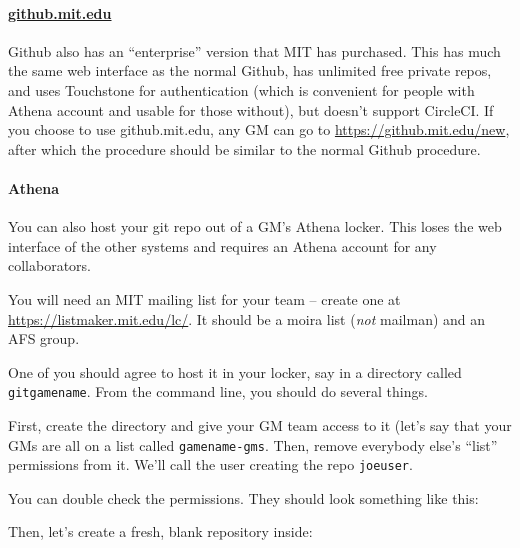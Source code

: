 \documentclass[green]{testgame}
\begin{document}
\paragraph*{\href{https://github.mit.edu}{github.mit.edu}} Github also has an ``enterprise'' version that MIT has purchased. This has much the same web interface as the normal Github, has unlimited free private repos, and uses Touchstone for authentication (which is convenient for people with Athena account and usable for those without), but doesn't support CircleCI. If you choose to use github.mit.edu, any GM can go to \url{https://github.mit.edu/new}, after which the procedure should be similar to the normal Github procedure.

\paragraph*{Athena} You can also host your git repo out of a GM's Athena locker. This loses the web interface of the other systems and requires an Athena account for any collaborators.

You will need an MIT mailing list for your team -- create one at \url{https://listmaker.mit.edu/lc/}.  It should be a moira list (\emph{not} mailman) and an AFS group.

One of you should agree to host it in your locker, say in a directory called \texttt{gitgamename}. From the command line, you should do several things.

First, create the directory and give your GM team access to it (let's
say that your GMs are all on a list called \texttt{gamename-gms}. Then,
remove everybody else's ``list'' permissions from it. We'll call the
user creating the repo \texttt{joeuser}.


You can double check the permissions. They should look something like
this:


Then, let's create a fresh, blank repository inside:
\end{document}
